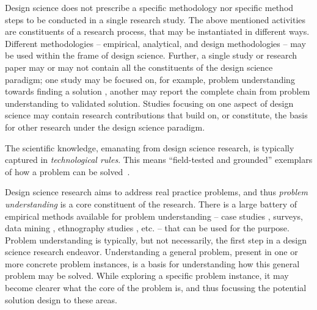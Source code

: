 \documentclass[graybox]{svmult}
\newcommand{\emelie}[1]{\textcolor{red}{{\it [Emelie says: #1]}}}
\newcommand{\per}[1]{\textcolor{cyan}{{\it [Per says: #1]}}}
\newcommand{\emelie}[1]{}
\newcommand{\per}[1]{}
\begin{document}
Design science does not prescribe a specific methodology nor specific method steps to be conducted in a single research study. The above mentioned activities are constituents of  a research process, that may be instantiated in different ways. Different methodologies -- empirical, analytical, and  design methodologies -- may be used within the frame of design science. Further, a single study or research paper may or may not contain all the constituents of the design science paradigm; one study may be focused on, for example,  problem understanding towards finding a solution%
, another may report the complete chain from problem understanding to validated solution. Studies focusing on one aspect of design science may contain research contributions that build on, or constitute, the basis for other research under the design science paradigm.

The scientific knowledge, emanating from design science research, is typically captured in \emph{technological rules}. This means ``field-tested and grounded'' exemplars of how a problem can be solved~\cite{van_aken_management_2004}.

Design science research aims to address real practice problems, and thus \emph{problem understanding} is a core constituent of the research. There is a large battery of empirical methods available for problem understanding -- case studies \cite{Runeson12Case}, surveys, data mining \cite{MenziesDataMining2016}, ethnography studies \cite{SharpEthnography2016}, etc. -- that can be used for the purpose.
Problem understanding is typically, but not necessarily, the first step in a design science research endeavor. %
Understanding a general problem, present in one or more concrete problem instances, is a basis for understanding how this general problem may be solved.  While exploring a specific problem instance,   it may become clearer what the core of the problem is, and thus focussing the potential solution design to these areas. 
\end{document}
